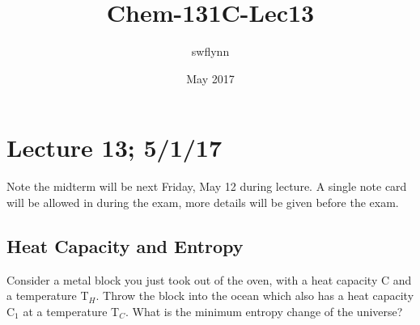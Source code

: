 \documentclass{article}
\title{Chem-131C-Lec13}
\author{swflynn }
\date{May 2017}
\begin{document}
\maketitle

\section*{Lecture 13; 5/1/17}
Note the midterm will be next Friday, May 12 during lecture. 
A single note card will be allowed in during the exam, more details will be given before the exam. 

\subsection*{Heat Capacity and Entropy}
Consider a metal block you just took out of the oven, with a heat capacity C and a temperature T$_H$. 
Throw the block into the ocean which also has a heat capacity C$_1$ at a temperature T$_C$. 
What is the minimum entropy change of the universe? 
\end{document}
